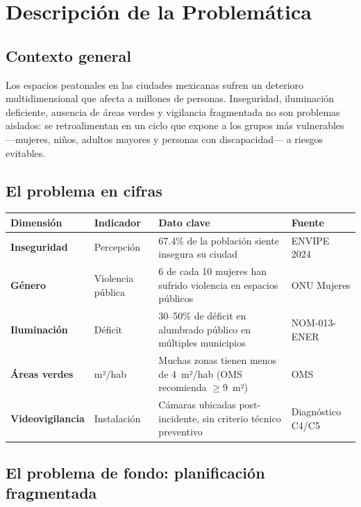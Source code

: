 \documentclass[12pt,a4paper]{article}
\begin{document}
\newpage
\section{Descripción de la Problemática}

\subsection{Contexto general}

Los espacios peatonales en las ciudades mexicanas sufren un deterioro multidimensional que afecta a millones de personas. Inseguridad, iluminación deficiente, ausencia de áreas verdes y vigilancia fragmentada no son problemas aislados: se retroalimentan en un ciclo que expone a los grupos más vulnerables —mujeres, niños, adultos mayores y personas con discapacidad— a riesgos evitables.

\subsection{El problema en cifras}

\begin{table}[H]
\centering
\small
\renewcommand{\arraystretch}{1.3}
\begin{tabularx}{\textwidth}{>{\bfseries}l l X l}
\toprule
\rowcolor{azuloscuro}
\color{white}\textbf{Dimensión} & \color{white}\textbf{Indicador} & \color{white}\textbf{Dato clave} & \color{white}\textbf{Fuente} \\
\midrule
Inseguridad & Percepción & 67.4\% de la población siente insegura su ciudad & ENVIPE 2024 \\
\rowcolor{fondoazul}
Género & Violencia pública & 6 de cada 10 mujeres han sufrido violencia en espacios públicos & ONU Mujeres \\
Iluminación & Déficit & 30–50\% de déficit en alumbrado público en múltiples municipios & NOM-013-ENER \\
\rowcolor{fondoazul}
Áreas verdes & m²/hab & Muchas zonas tienen menos de 4~m²/hab (OMS recomienda $\geq$9~m²) & OMS \\
Videovigilancia & Instalación & Cámaras ubicadas post-incidente, sin criterio técnico preventivo & Diagnóstico C4/C5 \\
\bottomrule
\end{tabularx}
\end{table}

\subsection{El problema de fondo: planificación fragmentada}
\end{document}
